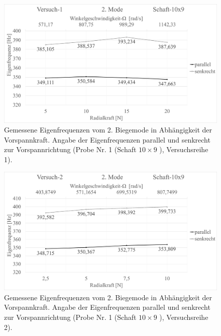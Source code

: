 	\begin{figure}[H]
		\centering
		\includegraphics[width=0.95\linewidth, height=0.36\textheight]{Ergebnisse/Schaft_10x9_2Mode_ver1} 
		\caption{Gemessene Eigenfrequenzen vom 2. Biegemode in Abhängigkeit der Vorspannkraft. Angabe der Eigenfrequenzen parallel und senkrecht zur Vorspannrichtung (Probe Nr. 1 (Schaft $ 10\times9 $ ), Versuchsreihe 1).}
		\label{fig:Result-Schaft-10x9-2Mode-Ver1}
	\end{figure}

	\begin{figure}[H]
		\centering
		\includegraphics[width=0.95\linewidth, height=0.36\textheight]{Ergebnisse/Schaft_10x9_2Mode_ver2} 
		\caption{Gemessene Eigenfrequenzen vom 2. Biegemode in Abhängigkeit der Vorspannkraft. Angabe der Eigenfrequenzen parallel und senkrecht zur Vorspannrichtung (Probe Nr. 1 (Schaft $ 10\times9 $ ), Versuchsreihe 2).}
		\label{fig:Result-Schaft-10x9-2Mode-Ver2}
	\end{figure}

